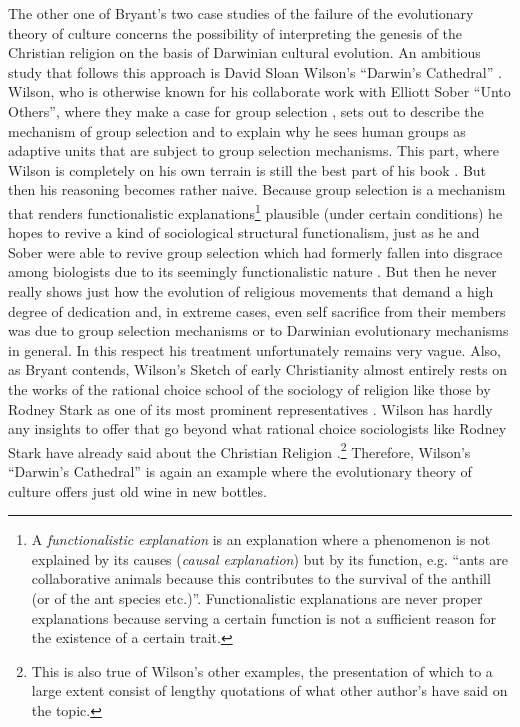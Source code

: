 The other one of Bryant's two case studies of the failure of the evolutionary
theory of culture concerns the possibility of interpreting the genesis of the
Christian religion on the basis of Darwinian cultural evolution. An ambitious
study that follows this approach is David Sloan Wilson's ``Darwin's
Cathedral'' \cite[]{wilson:2002}. Wilson, who is otherwise known for his
collaborate work with Elliott Sober ``Unto Others'', where they make a case
for group selection \cite[]{sober-wilson:1998}, sets out to describe the
mechanism of group selection and to explain why he sees human groups as
adaptive units that are subject to group selection mechanisms. This part,
where Wilson is completely on his own terrain is still the best part of his
book \cite[p.\ 5ff.]{wilson:2002}. But then his reasoning becomes rather naive.
Because group selection is a mechanism that renders functionalistic
explanations\footnote{A {\em functionalistic explanation} is an explanation
  where a phenomenon is not explained by its causes ({\em causal explanation})
  but by its function, e.g.  ``ants are collaborative animals because this
  contributes to the survival of the anthill (or of the ant species etc.)''.
  Functionalistic explanations are never proper explanations because serving
  a certain function is not a sufficient reason for the existence of a certain
  trait.}  plausible (under certain conditions) he hopes to revive a kind of
sociological structural functionalism, just as he and Sober were able to
revive group selection which had formerly fallen into disgrace among
biologists due to its seemingly functionalistic nature \cite[p.\ 
55ff.]{sober-wilson:1998}. But then he never really shows just how the
evolution of religious movements that demand a high degree of dedication and,
in extreme cases, even self sacrifice from their members was due to group
selection mechanisms or to Darwinian evolutionary mechanisms in
general. In this respect his treatment unfortunately remains very vague. Also,
as Bryant contends, Wilson's Sketch of early Christianity almost entirely
rests on the works of the rational choice school of the sociology of religion
like those by Rodney Stark as one of its most prominent representatives
\cite[p.\ 482]{bryant:2004}. Wilson has hardly any insights to offer that go
beyond what rational choice sociologists like Rodney Stark have already said
about the Christian Religion \cite[p.\ 147ff.]{wilson:2002}.\footnote{This is
  also true of Wilson's other examples, the presentation of which to a large extent
  consist of lengthy quotations of what other author's have
  said on the topic.} Therefore, Wilson's ``Darwin's Cathedral'' is again an
example where the evolutionary theory of culture offers just old wine in new
bottles.

